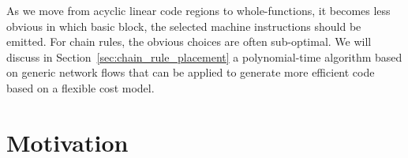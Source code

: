 As we move from acyclic linear code regions to whole-functions, it
becomes less obvious in which basic block, the selected
machine instructions should be emitted. For chain rules, the obvious
choices are often sub-optimal. We will discuss in
Section~\ref{sec:chain_rule_placement} a polynomial-time algorithm
based on generic network flows that can be applied to generate more
efficient code based on a flexible cost model.

\section{Motivation}
\label{sec:motivation}

\begin{figure}[ht]
  \begin{center}






\end{center}
\end{figure}
